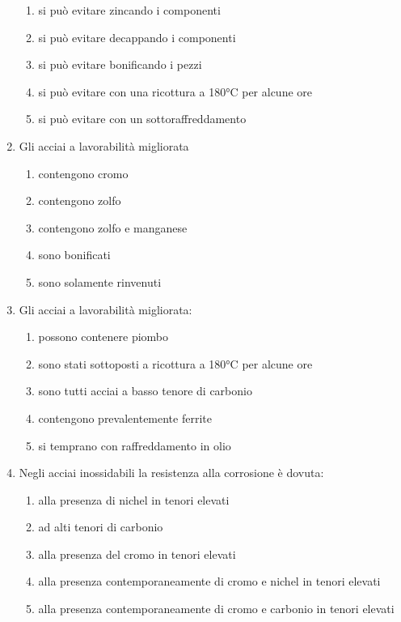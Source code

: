 \begin{enumerate}
    \begin{enumerate}
        \item si può evitare zincando i componenti
        \item si può evitare decappando i componenti
        \item si può evitare bonificando i pezzi
        \item si può evitare con una ricottura a 180°C per alcune ore
        \item si può evitare con un sottoraffreddamento
    \end{enumerate}
    \item Gli acciai a lavorabilità migliorata
    \begin{enumerate}
        \item contengono cromo
        \item contengono zolfo
        \item contengono zolfo e manganese
        \item sono bonificati
        \item sono solamente rinvenuti
    \end{enumerate}
    \item Gli acciai a lavorabilità migliorata:
    \begin{enumerate}
        \item possono contenere piombo
        \item sono stati sottoposti a ricottura a 180°C per alcune ore
        \item sono tutti acciai a basso tenore di carbonio
        \item contengono prevalentemente ferrite
        \item si temprano con raffreddamento in olio
    \end{enumerate}
    \item Negli acciai inossidabili la resistenza alla corrosione è dovuta:
    \begin{enumerate}
        \item alla presenza di nichel in tenori elevati
        \item ad alti tenori di carbonio
        \item alla presenza del cromo in tenori elevati
        \item alla presenza contemporaneamente di cromo e nichel in tenori elevati
        \item alla presenza contemporaneamente di cromo e carbonio in tenori elevati
    \end{enumerate}

\end{enumerate}
